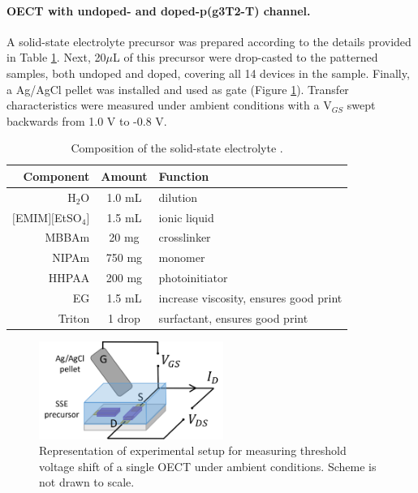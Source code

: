 \paragraph{OECT with undoped- and doped-p(g3T2-T) channel.} A solid-state electrolyte precursor was prepared according to the details provided in Table \ref{tab:sse}. Next, 20$\mu$L of this precursor were drop-casted to the patterned samples, both undoped and doped, covering all 14 devices in the sample. Finally, a Ag/AgCl pellet was installed and used as gate (Figure \ref{fig:biosetup}). Transfer characteristics were measured under ambient conditions with a V$_{GS}$ swept backwards from 1.0 V to -0.8 V. %

\begin{table}[ht]
	\centering
	\caption{Composition of the solid-state electrolyte \cite{weissbachPhotopatternableSolidElectrolyte2022}.}
	\begin{tabular}{r c l} \hline
		Component   & Amount & Function \\ \hline
		H$_{2}$O	& 1.0 mL & dilution \\ 
		$[$EMIM$][$EtSO$_{4}]$   & 1.5 mL & ionic liquid \\ 
		MBBAm   & 20 mg & crosslinker \\ 
		NIPAm   & 750 mg & monomer \\ 
		HHPAA   & 200 mg & photoinitiator \\
		EG	& 1.5 mL	& increase viscosity, ensures good print \\ 
		Triton & 1 drop & surfactant, ensures good print \\  \hline
	\end{tabular}
	\label{tab:sse}
\end{table}

\begin{figure}[!ht]
	\centering
	\includegraphics[width=6cm]{Images/pdf/bioprobe_setup.pdf}
	\caption{Representation of experimental setup for measuring threshold voltage shift of a single OECT under ambient conditions. Scheme is not drawn to scale.}
	\label{fig:biosetup}
\end{figure}

